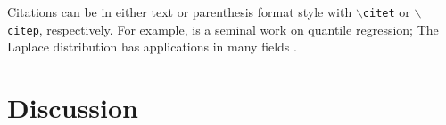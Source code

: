 \documentclass[letterpaper, inpress]{jds} %
\begin{document}
Citations can be in either text or parenthesis format style with
\texttt{$\backslash$citet} or \texttt{$\backslash$citep},
respectively. For example, \citet{KoenkerBassett1978} is a seminal
work on quantile regression; The Laplace distribution has applications
in many fields \citep{Kotz2001}.


\section{Discussion}

\lipsum[1-3]



\end{document}
